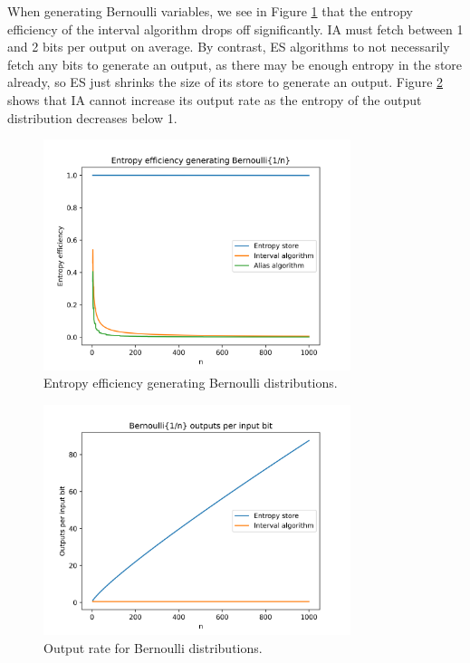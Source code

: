 \documentclass[12pt]{article}
\begin{document}
When generating Bernoulli variables, we see in Figure \ref{fig:bernoulli-efficiency} that the entropy efficiency of the interval algorithm drops off significantly. IA must fetch between 1 and 2 bits per output on average. By contrast, ES algorithms to not necessarily fetch any bits to generate an output, as there may be enough entropy in the store already, so ES just shrinks the size of its store to generate an output. Figure \ref{fig:bernoulli-rate} shows that IA cannot increase its output rate as the entropy of the output distribution decreases below 1.

\begin{figure}[ht]
\centering
\includegraphics[width=0.8\textwidth]{bernoulli_efficiency.png}
\caption{Entropy efficiency generating Bernoulli distributions.}
\label{fig:bernoulli-efficiency}
\end{figure}

\begin{figure}[ht]
\centering
\includegraphics[width=0.8\textwidth]{bernoulli_rate.png}
\caption{Output rate for Bernoulli distributions.}
\label{fig:bernoulli-rate}
\end{figure}
\end{document}
